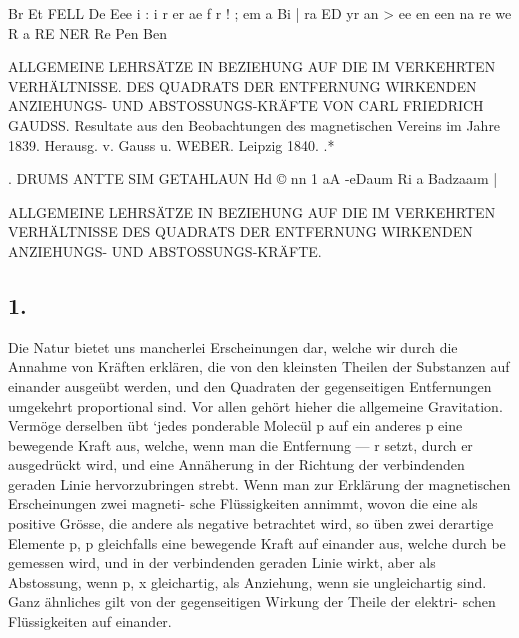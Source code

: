 \documentclass[12pt,a4paper]{article}
\begin{document}
\newpage


Br Et FELL De Eee i : i r er ae f r ! ; em a Bi | ra ED yr an > ee en een na re we R a RE NER Re Pen Ben


\newpage


ALLGEMEINE LEHRSÄTZE IN BEZIEHUNG AUF DIE IM VERKEHRTEN VERHÄLTNISSE. DES QUADRATS DER ENTFERNUNG WIRKENDEN ANZIEHUNGS- UND ABSTOSSUNGS-KRÄFTE VON CARL FRIEDRICH GAUDSS. Resultate aus den Beobachtungen des magnetischen Vereins im Jahre 1839. Herausg. v. Gauss u. WEBER. Leipzig 1840. .*


\newpage


. DRUMS ANTTE SIM GETAHLAUN Hd \copyright{} nn 1 aA -eDaum Ri a Badzaa\i{}m |


\newpage


ALLGEMEINE LEHRSÄTZE IN BEZIEHUNG AUF DIE IM VERKEHRTEN VERHÄLTNISSE DES QUADRATS DER ENTFERNUNG WIRKENDEN ANZIEHUNGS- UND ABSTOSSUNGS-KRÄFTE.

\subsection*{1.}
Die Natur bietet uns mancherlei Erscheinungen dar, welche wir durch die Annahme von Kräften erklären, die von den kleinsten Theilen der Substanzen auf einander ausgeübt werden, und den Quadraten der gegenseitigen Entfernungen umgekehrt proportional sind. Vor allen gehört hieher die allgemeine Gravitation. Vermöge derselben übt `jedes ponderable Molecül p auf ein anderes p eine bewegende Kraft aus, welche, wenn man die Entfernung --- r setzt, durch er ausgedrückt wird, und eine Annäherung in der Richtung der verbindenden geraden Linie hervorzubringen strebt. Wenn man zur Erklärung der magnetischen Erscheinungen zwei magneti- sche Flüssigkeiten annimmt, wovon die eine als positive Grösse, die andere als negative betrachtet wird, so üben zwei derartige Elemente p, p gleichfalls eine bewegende Kraft auf einander aus, welche durch be gemessen wird, und in der verbindenden geraden Linie wirkt, aber als Abstossung, wenn p, x gleichartig, als Anziehung, wenn sie ungleichartig sind. Ganz ähnliches gilt von der gegenseitigen Wirkung der Theile der elektri- schen Flüssigkeiten auf einander.


\newpage
\end{document}
